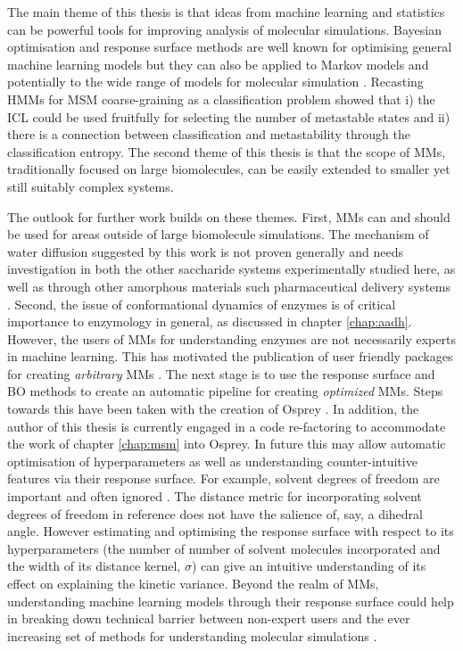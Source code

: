 The main theme of this thesis is that ideas from machine learning and statistics can be powerful tools for improving analysis of molecular simulations. Bayesian optimisation and response surface methods are well known for optimising general machine learning models but they can also be applied to Markov models and potentially to the wide range of models for molecular simulation \cite{noeMachineLearningMolecular2020}. Recasting HMMs for MSM coarse-graining as a classification problem showed that i) the ICL could be used fruitfully for selecting the number of metastable states and ii) there is a connection between classification and metastability through the classification entropy. The second theme of this thesis is that the scope of MMs, traditionally focused on large biomolecules, can be easily extended to smaller yet still suitably complex systems.  

The outlook for further work builds on these themes.  First, MMs can and should be used for areas outside of large biomolecule simulations. The mechanism of water diffusion suggested by this work is not proven generally and needs investigation in both the other saccharide systems experimentally studied here, as well as through other amorphous materials such pharmaceutical delivery systems \cite{hancockCharacteristicsSignificanceAmorphous1997}. Second, the issue of conformational dynamics of enzymes is of critical importance to enzymology in general, as discussed in chapter \ref{chap:aadh}.  However, the users of MMs for understanding enzymes are not necessarily experts in machine learning. This has motivated the publication of user friendly packages for creating \emph{arbitrary} MMs \cite{schererPyEMMASoftwarePackage2015a,beauchampMSMBuilder2ModelingConformational2011}.  The next stage is to use the response surface and BO methods to create an automatic  pipeline for creating \emph{optimized} MMs. Steps towards this have been taken with the creation of Osprey \cite{mcgibbonOspreyHyperparameterOptimization2016}.  In addition, the author of this thesis is currently engaged in a code re-factoring to accommodate the work of chapter \ref{chap:msm} into Osprey. In future this may allow automatic optimisation of hyperparameters as well as understanding counter-intuitive features via their response surface. For example, solvent degrees of freedom are important and often ignored \cite{guBuildingMarkovState2013}. The distance metric for incorporating solvent degrees of freedom in reference \cite{guBuildingMarkovState2013} does not have the salience of, say, a dihedral angle. However estimating and optimising the response surface with respect to its hyperparameters (the number of number of solvent molecules incorporated and the width of its distance kernel, $\sigma$) can give an intuitive understanding of its effect on explaining the kinetic variance. Beyond the realm of MMs, understanding machine learning models through their response surface could help in breaking down technical barrier between non-expert users and the ever increasing set of methods for understanding molecular simulations \cite{noeMachineLearningMolecular2020}.

